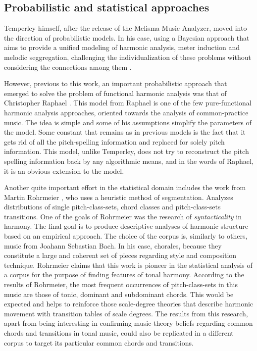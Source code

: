     \subsection{Probabilistic and statistical approaches}
    Temperley himself, after the release of the Melisma Music Analyzer, moved into the direction of probabilistic models. In his case, using a Bayesian approach that aims to provide a unified modeling of harmonic analysis, meter induction and melodic seggregation, challenging the individualization of these problems without considering the connections among them \cite{temperley2009unified}.

    However, previous to this work, an important probabilistic approach that emerged to solve the problem of functional harmonic analysis was that of Christopher Raphael \cite{raphael2003harmonic}.
    This model from Raphael is one of the few pure-functional harmonic analysis approaches, oriented towards the analysis of common-practice music. The idea is simple and some of his assumptions simplify the parameters of the model. Some constant that remains as in previous models is the fact that it gets rid of all the pitch-spelling information and replaced for solely pitch information. This model, unlike Temperley, does not try to reconstruct the pitch spelling information back by any algorithmic means, and in the words of Raphael, it is an obvious extension to the model.

    Another quite important effort in the statistical domain includes the work from Martin Rohrmeier \cite{rohrmeier2008statistical}, who uses a heuristic method of segmentation. Analyzes distributions of single pitch-class-sets, chord classes and pitch-class-sets transitions. One of the goals of Rohrmeier was the research of \emph{syntacticality} in harmony. The final goal is to produce descriptive analyses of harmonic structure based on an empirical approach. The choice of the corpus is, similarly to others, music from Joahann Sebastian Bach. In his case, chorales, because they constitute a large and coherent set of pieces regarding style and composition technique. Rohrmeier claims that this work is pioneer in the statistical analysis of a corpus for the purpose of finding features of tonal harmony. According to the results of Rohrmeier, the most frequent occurrences of pitch-class-sets in this music are those of tonic, dominant and subdominant chords. This would be expected and helps to reinforce those scale-degree theories that describe harmonic movement with transition tables of scale degrees. The results from this research, apart from being interesting in confirming music-theory beliefs regarding common chords and transitions in tonal music, could also be replicated in a different corpus to target its particular common chords and transitions.

